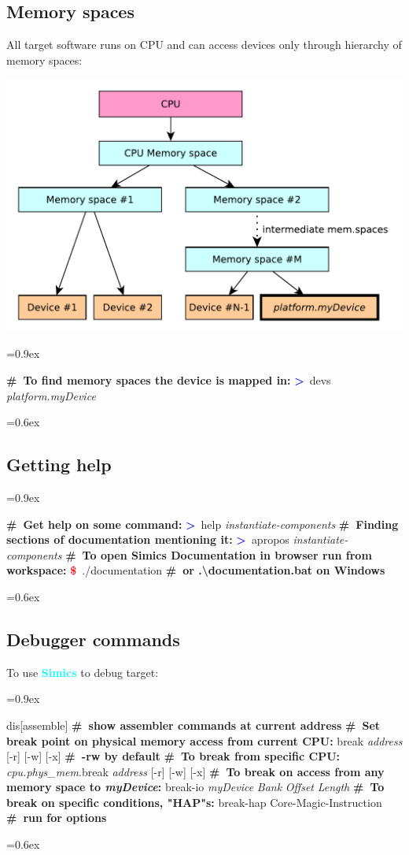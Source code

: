 \documentclass[8pt]{extarticle}
\newenvironment{code}[1][]{%
\begin{prebox}[#1]\obeylines%
\fontdimen2\font=0.9ex%
}{%
\end{prebox}%
\fontdimen2\font=0.6ex%
}
\newcommand{\cod}[2][green!10]{\tcbox[
    size=fbox,
    on line,
    colback=#1,
    colframe=black,
    arc=0.3em  %
]{#2}}
\newcommand{\ind}{\hphantom{~~~}}
\newcommand{\prompt}{\textcolor{red}{\textbf{\$}\ }}
\newcommand{\sprompt}{\textcolor{blue}{\textbf{>}\ }}
\newcommand{\cmtcommon}[1]{\textcolor{Sepia}{\textbf{#1}}}
\newcommand{\cmt}[1]{\cmtcommon{\#\ #1}}
\newcommand{\p}[1]{\textit{\large#1}}
\newcommand{\Simics}{\textcolor{cyan}{\textbf{Simics}}}
\begin{document}
\begin{multicols*}{3}
\subsection{Memory spaces}

All target software runs on CPU and can access devices only through
hierarchy of memory spaces:

\noindent\includegraphics[width=\linewidth]{diagrams/mem_spaces.pdf}

\begin{code}
    \cmt{To find memory spaces the device is mapped in:}
    \sprompt devs \p{platform.myDevice}
\end{code}

\subsection{Getting help}
\begin{code}
    \cmt{Get help on some command:}
    \sprompt{help \p{instantiate-components}}
    \cmt{Finding sections of documentation mentioning it:}
    \sprompt{apropos \p{instantiate-components}}
    \cmt{To open Simics Documentation in browser run from workspace:}
    \prompt ./documentation \ind \cmt{or .\textbackslash{}documentation.bat on Windows}
\end{code}

\subsection{Debugger commands}
To use \Simics{} to debug target:
\begin{code}
    dis[assemble] \cmt{show assembler commands at current address}
    \cmt{Set break point on physical memory access from current CPU:}
    break \p{address} [-r] [-w] [-x] \cmt{-rw by default}
    \cmt{To break from specific CPU:}
    \p{cpu.phys_mem}.break \p{address} [-r] [-w] [-x]
    \cmt{To break on access from any memory space to \p{myDevice}:}
    break-io \p{myDevice} \p{Bank} \p{Offset} \p{Length}
    \cmt{To break on specific conditions, "HAP"s:}
    break-hap Core-Magic-Instruction \cmt{run \cod{list-haps} for options}
\end{code}


\end{multicols*}
\end{document}
